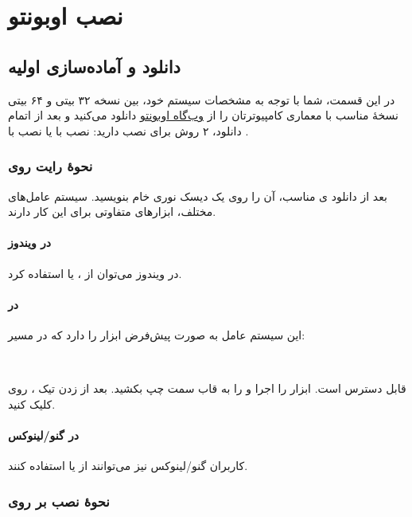 \chapter{نصب اوبونتو}
\section{دانلود و آماده‌سازی اولیه}
در این قسمت، شما با توجه به مشخصات سیستم خود، بین نسخه ۳۲ بیتی و ۶۴ بیتی نسخهٔ مناسب با معماری کامپیوترتان را از \href{http://www.ubuntu.com/download/desktop}{وب‌گاه اوبونتو} دانلود می‌کنید و بعد از اتمام دانلود، ۲ روش برای نصب دارید: نصب با  یا نصب با .

\subsection[نحوهٔ رایت روی DVD]{نحوهٔ رایت روی }
بعد از دانلود ی مناسب، آن را روی یک دیسک نوری خام بنویسید. سیستم عامل‌های مختلف، ابزارهای متفاوتی برای این کار دارند.

\subsubsection{در ویندوز}
در ویندوز می‌توان از ،  یا  استفاده کرد.

\subsubsection{در }
این سیستم عامل به صورت پیش‌فرض ابزار  را دارد که در مسیر:\\
\begin{flushleft}
\\
\end{flushleft}
قابل دسترس است. ابزار  را اجرا و  را به قاب سمت چپ بکشید. بعد از زدن تیک ، روی  کلیک کنید.

\subsubsection{در گنو/لینوکس}
کاربران گنو/لینوکس نیز می‌توانند از  یا  استفاده کنند.

\subsection[نحوهٔ نصب بر روی USB]{نحوهٔ نصب بر روی }
